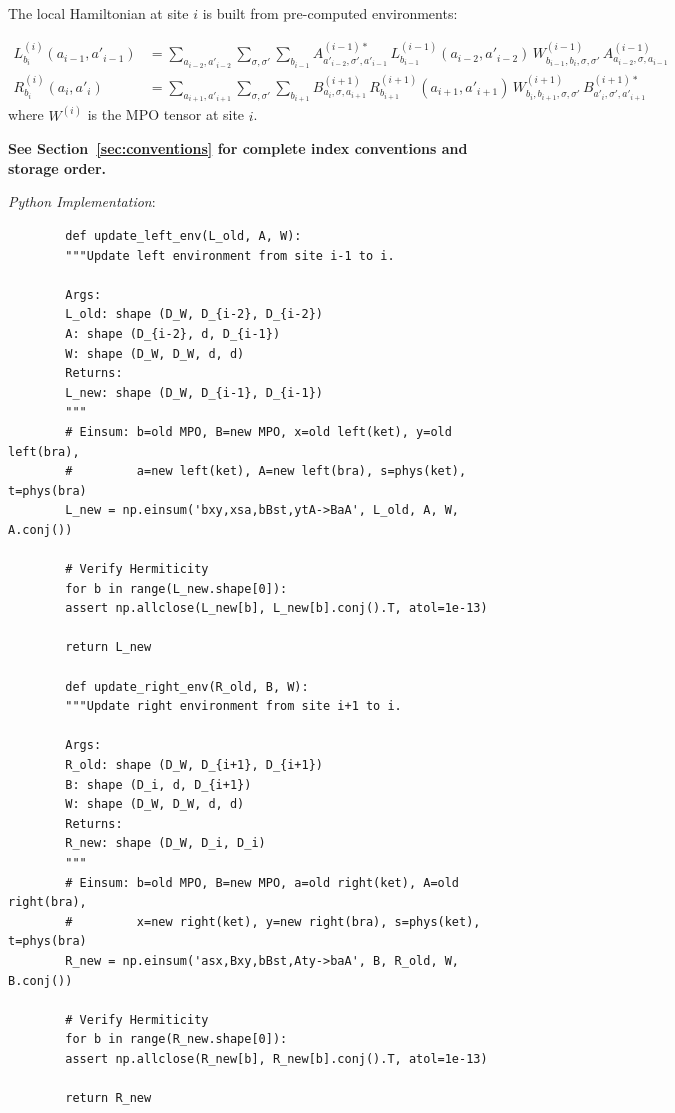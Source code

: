 \documentclass[aps,prb,onecolumn,scriptaddress]{revtex4-2}
\begin{document}
	The local Hamiltonian at site $i$ is built from pre-computed environments:
	
	\begin{align}
		L^{(i)}_{b_i}(a_{i-1}, a'_{i-1}) &= \sum_{a_{i-2}, a'_{i-2}} \sum_{\sigma, \sigma'} \sum_{b_{i-1}} A^{(i-1)*}_{a'_{i-2},\sigma',a'_{i-1}} \, L^{(i-1)}_{b_{i-1}}(a_{i-2}, a'_{i-2}) \, W^{(i-1)}_{b_{i-1},b_i,\sigma,\sigma'} \, A^{(i-1)}_{a_{i-2},\sigma,a_{i-1}} \\
		R^{(i)}_{b_i}(a_i, a'_i) &= \sum_{a_{i+1}, a'_{i+1}} \sum_{\sigma, \sigma'} \sum_{b_{i+1}} B^{(i+1)}_{a_i,\sigma,a_{i+1}} \, R^{(i+1)}_{b_{i+1}}(a_{i+1}, a'_{i+1}) \, W^{(i+1)}_{b_i,b_{i+1},\sigma,\sigma'} \, B^{(i+1)*}_{a'_i,\sigma',a'_{i+1}}
	\end{align}	
	where $W^{(i)}$ is the MPO tensor at site $i$.
	
	\textbf{See Section~\ref{sec:conventions} for complete index conventions and storage order.}
	
	\textit{Python Implementation}:
	\begin{verbatim}
		def update_left_env(L_old, A, W):
		"""Update left environment from site i-1 to i.
		
		Args:
		L_old: shape (D_W, D_{i-2}, D_{i-2})
		A: shape (D_{i-2}, d, D_{i-1})
		W: shape (D_W, D_W, d, d)
		Returns:
		L_new: shape (D_W, D_{i-1}, D_{i-1})
		"""
		# Einsum: b=old MPO, B=new MPO, x=old left(ket), y=old left(bra),
		#         a=new left(ket), A=new left(bra), s=phys(ket), t=phys(bra)
		L_new = np.einsum('bxy,xsa,bBst,ytA->BaA', L_old, A, W, A.conj())
		
		# Verify Hermiticity
		for b in range(L_new.shape[0]):
		assert np.allclose(L_new[b], L_new[b].conj().T, atol=1e-13)
		
		return L_new
		
		def update_right_env(R_old, B, W):
		"""Update right environment from site i+1 to i.
		
		Args:
		R_old: shape (D_W, D_{i+1}, D_{i+1})
		B: shape (D_i, d, D_{i+1})
		W: shape (D_W, D_W, d, d)
		Returns:
		R_new: shape (D_W, D_i, D_i)
		"""
		# Einsum: b=old MPO, B=new MPO, a=old right(ket), A=old right(bra),
		#         x=new right(ket), y=new right(bra), s=phys(ket), t=phys(bra)
		R_new = np.einsum('asx,Bxy,bBst,Aty->baA', B, R_old, W, B.conj())
		
		# Verify Hermiticity
		for b in range(R_new.shape[0]):
		assert np.allclose(R_new[b], R_new[b].conj().T, atol=1e-13)
		
		return R_new
	\end{verbatim}
	
\end{document}
